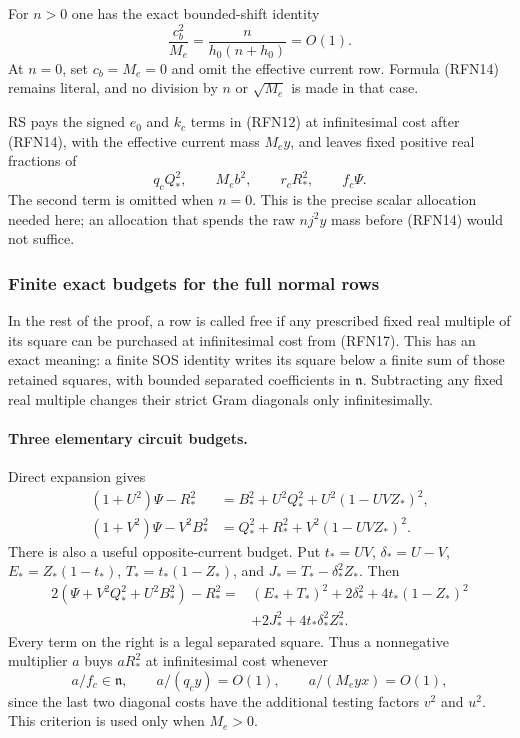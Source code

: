 For $n>0$ one has the exact bounded-shift identity
\[
 \frac{c_b^2}{M_e}=\frac{n}{h_0(n+h_0)}=O(1).
                                                               \tag{RFN16}
\]
At $n=0$, set $c_b=M_e=0$ and omit the effective current row.  Formula
(RFN14) remains literal, and no division by $n$ or $\sqrt{M_e}$ is
made in that case.

RS pays the signed $e_0$ and $k_c$ terms in (RFN12) at infinitesimal
cost after (RFN14), with the effective current mass $M_e y$, and leaves
fixed positive real fractions of
\[
 q_cQ_*^2,\qquad M_e b^2,\qquad r_cR_*^2,\qquad f_c\Psi. \tag{RFN17}
\]
The second term is omitted when $n=0$.  This is the precise scalar
allocation needed here; an allocation that spends the raw $nj^2y$
mass before (RFN14) would not suffice.

\subsubsection*{Finite exact budgets for the full normal rows}

In the rest of the proof, a row is called free if any prescribed fixed
real multiple of its square can be purchased at infinitesimal cost
from (RFN17).  This has an exact meaning: a finite SOS identity writes
its square below a finite sum of those retained squares, with bounded
separated coefficients in $\mathfrak n$.  Subtracting any fixed real
multiple changes their strict Gram diagonals only infinitesimally.

\paragraph{Three elementary circuit budgets.}
Direct expansion gives
\begin{align}
 (1+U^2)\Psi-R_*^2
     &=B_*^2+U^2Q_*^2+U^2(1-UVZ_*)^2,                  \tag{RFN18a}\\
 (1+V^2)\Psi-V^2B_*^2
     &=Q_*^2+R_*^2+V^2(1-UVZ_*)^2.                   \tag{RFN18b}
\end{align}
There is also a useful opposite-current budget.  Put
$t_*=UV$, $\delta_*=U-V$, $E_*=Z_*(1-t_*)$,
$T_*=t_*(1-Z_*)$, and $J_*=T_*-\delta_*^2Z_*$.  Then
\begin{align}
 2(\Psi+V^2Q_*^2+U^2B_*^2)-R_*^2
 ={}&(E_*+T_*)^2+2\delta_*^2+4t_*(1-Z_*)^2\\
   &+2J_*^2+4t_*\delta_*^2Z_*^2.                      \tag{RFN18c}
\end{align}
Every term on the right is a legal separated square.  Thus a
nonnegative multiplier $a$ buys $aR_*^2$ at infinitesimal cost whenever
\[
 a/f_c\in\mathfrak n,\qquad a/(q_cy)=O(1),\qquad
 a/(M_e yx)=O(1),                                      \tag{RFN18d}
\]
since the last two diagonal costs have the additional testing factors
$v^2$ and $u^2$.  This criterion is used only when $M_e>0$.

